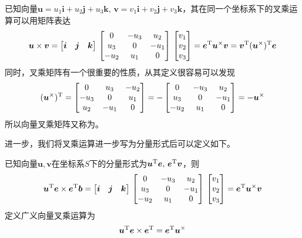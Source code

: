 {
	已知向量$\bm{u} = u_1\bm{i} +u_2\bm{j} +u_3\bm{k}, \, \bm{v} = v_1\bm{i} + v_2\bm{j} + v_3 \bm{k}$，其在同一个坐标系下的叉乘运算可以用矩阵表达
	\begin{equation}
		\bm{u} \times \bm{v} = 	
		\big[ \bm{i} \quad \bm{j} \quad \bm{k} \big] \,
		\begin{bmatrix}
			0 & -u_3 & u_2 \\
			u_3 & 0 & -u_1 \\
			-u_2  &  u_1 & 0
		\end{bmatrix}
		\, 
		\begin{bmatrix}
			v_1 \\
			v_2 \\
			v_3 
		\end{bmatrix}
	=\bm{e}^{\text{T}} \bm{u}^\times \bm{v} = \bm{v}^{\text{T}} (\bm{u}^\times)^{\text{T}} \bm{e}
	\end{equation}
	同时，叉乘矩阵有一个很重要的性质，从其定义很容易可以发现
	\begin{equation}
		(\bm{u}^\times )^{\text{T}} = 
		\begin{bmatrix}
			0 & u_3 & -u_2 \\
			-u_3 & 0 & u_1 \\
			u_2  &  -u_1 & 0
		\end{bmatrix}
		= -
		\begin{bmatrix}
			0 & -u_3 & u_2 \\
			u_3 & 0 & -u_1 \\
			-u_2  &  u_1 & 0
		\end{bmatrix}
		= - \bm{u}^\times
	\end{equation}
    所以向量叉乘矩阵又称为。
}

进一步，我们将叉乘运算进一步写为分量形式后可以定义如下。

{
	已知向量$\bm{u}, \bm{v}$在坐标系$S$下的分量形式为$\bm{u}^{\text{T}} \bm{e}, \, \bm{e}^{\text{T}} \bm{v}$，则
	\begin{equation}
		\bm{u}^{\text{T}} \bm{e} \times \bm{e}^{\text{T}} \bm{b} = \big[ \bm{i} \quad \bm{j} \quad \bm{k} \big] \,
		\begin{bmatrix}
			0 & -u_3 & u_2 \\
			u_3 & 0 & -u_1 \\
			-u_2  &  u_1 & 0
		\end{bmatrix}
		\, 
		\begin{bmatrix}
			v_1 \\
			v_2 \\
			v_3 
		\end{bmatrix}
		=\bm{e}^{\text{T}} \bm{u}^\times \bm{v}
	\end{equation}
	定义广义向量叉乘运算为
	\begin{equation}
		\bm{u}^{\text{T}} \bm{e} \times \bm{e}^{\text{T}} = \bm{e}^{\text{T}} \bm{u}^\times
	\end{equation}
}
\label{广义向量叉乘运算}




